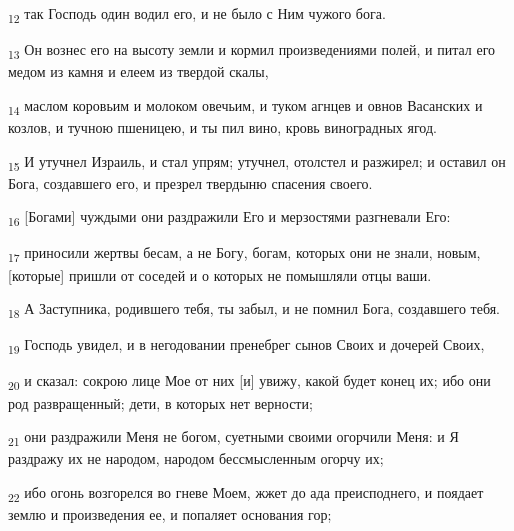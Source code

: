 \begin{tcolorbox}
\textsubscript{12} так Господь один водил его, и не было с Ним чужого бога.
\end{tcolorbox}
\begin{tcolorbox}
\textsubscript{13} Он вознес его на высоту земли и кормил произведениями полей, и питал его медом из камня и елеем из твердой скалы,
\end{tcolorbox}
\begin{tcolorbox}
\textsubscript{14} маслом коровьим и молоком овечьим, и туком агнцев и овнов Васанских и козлов, и тучною пшеницею, и ты пил вино, кровь виноградных ягод.
\end{tcolorbox}
\begin{tcolorbox}
\textsubscript{15} И утучнел Израиль, и стал упрям; утучнел, отолстел и разжирел; и оставил он Бога, создавшего его, и презрел твердыню спасения своего.
\end{tcolorbox}
\begin{tcolorbox}
\textsubscript{16} [Богами] чуждыми они раздражили Его и мерзостями разгневали Его:
\end{tcolorbox}
\begin{tcolorbox}
\textsubscript{17} приносили жертвы бесам, а не Богу, богам, которых они не знали, новым, [которые] пришли от соседей и о которых не помышляли отцы ваши.
\end{tcolorbox}
\begin{tcolorbox}
\textsubscript{18} А Заступника, родившего тебя, ты забыл, и не помнил Бога, создавшего тебя.
\end{tcolorbox}
\begin{tcolorbox}
\textsubscript{19} Господь увидел, и в негодовании пренебрег сынов Своих и дочерей Своих,
\end{tcolorbox}
\begin{tcolorbox}
\textsubscript{20} и сказал: сокрою лице Мое от них [и] увижу, какой будет конец их; ибо они род развращенный; дети, в которых нет верности;
\end{tcolorbox}
\begin{tcolorbox}
\textsubscript{21} они раздражили Меня не богом, суетными своими огорчили Меня: и Я раздражу их не народом, народом бессмысленным огорчу их;
\end{tcolorbox}
\begin{tcolorbox}
\textsubscript{22} ибо огонь возгорелся во гневе Моем, жжет до ада преисподнего, и поядает землю и произведения ее, и попаляет основания гор;
\end{tcolorbox}

